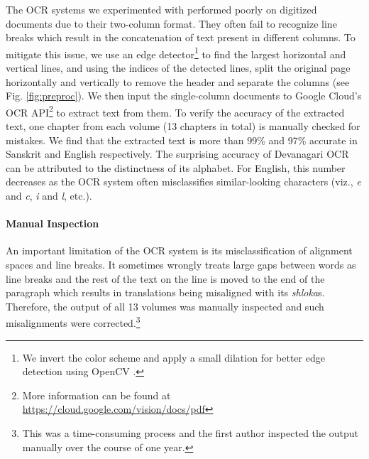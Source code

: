 \documentclass[11pt,a4paper]{article}
\begin{document}
The OCR systems we experimented with performed poorly on digitized documents due to their two-column format. They often fail to recognize line breaks which result in the concatenation of text present in different columns. To mitigate this issue, we use an edge detector\footnote{We invert the color scheme and apply a small dilation for better edge detection using OpenCV \cite{opencv}.} to find the largest horizontal and vertical lines, and using the indices of the detected lines, split the original page horizontally and vertically to remove the header and separate the columns (see Fig. \ref{fig:preproc}). We then input the single-column documents to Google Cloud's OCR API\footnote{More information can be found at \url{https://cloud.google.com/vision/docs/pdf}} to extract text from them. To verify the accuracy of the extracted text, one chapter from each volume (13 chapters in total) is manually checked for mistakes. We find that the extracted text is more than 99\% and 97\% accurate in Sanskrit and English respectively. The surprising accuracy of Devanagari OCR can be attributed to the distinctness of its alphabet. For English, this number decreases as the OCR system often misclassifies similar-looking characters (viz., {\it e} and {\it c}, {\it i} and {\it l}, etc.).

\paragraph{Manual Inspection}

An important limitation of the OCR system is its misclassification of alignment spaces and line breaks. It sometimes wrongly treats large gaps between words as line breaks and the rest of the text on the line is moved to the end of the paragraph which results in translations being misaligned with its {\it shloka}s. Therefore, the output of all 13 volumes was manually inspected and such misalignments were corrected.\footnote{This was a time-consuming process and the first author inspected the output manually over the course of one year.}
\end{document}
